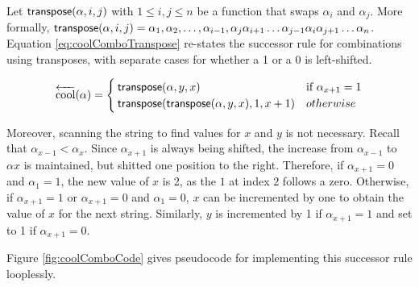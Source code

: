  Let $\mathsf{transpose(} \alpha, i, j \mathsf{)}$ with $1 \le i,j \le n$ be a function that swaps $\alpha_i$ and $\alpha_j$.  More formally, $\mathsf{transpose(} \alpha, i, j \mathsf{)}=\alpha_1,\alpha_2,\dots,\alpha_{i-1},\alpha_{j}\alpha_{i+1}\dots \alpha_{j-1}\alpha_i \alpha_{j+1}\dots \alpha_n$.  Equation \eqref{eq:coolComboTranspose} re-states the successor rule for combinations using transposes, with separate cases for whether a 1 or a 0 is left-shifted.

\begin{equation}\label{eq:coolComboTranspose}
    \overleftarrow{\text{cool}}(\alpha) = \begin{cases}
	\mathsf{transpose(} \alpha, y, x \mathsf{)} & \text{if $\alpha_{x+1}=1$}\\
	\mathsf{transpose(} \mathsf{transpose(} \alpha, y, x \mathsf{)}, 1, x+1 \mathsf{)} & otherwise\\
\end{cases}
\end{equation}

Moreover, scanning the string to find values for $x$ and $y$ is not necessary.  Recall that $\alpha_{x-1} < \alpha_{x}$.  Since $\alpha_{x+1}$ is always being shifted, the increase from $\alpha_{x-1}$ to $\alpha{x}$ is maintained, but shitted one position to the right.  Therefore, if $\alpha_{x+1}=0$ and $\alpha_{1}=1$, the new value of $x$ is 2, as the $1$ at index $2$ follows a zero.  Otherwise, if $\alpha_{x+1}=1$ or $\alpha_{x+1}=0$ and $\alpha_{1}=0$, $x$ can be incremented by one to obtain the value of $x$ for the next string.  Similarly, $y$ is incremented by 1 if $\alpha_{x+1}=1$ and set to 1 if $\alpha_{x+1}=0$.

Figure \ref{fig:coolComboCode} gives pseudocode for implementing this successor rule looplessly.

